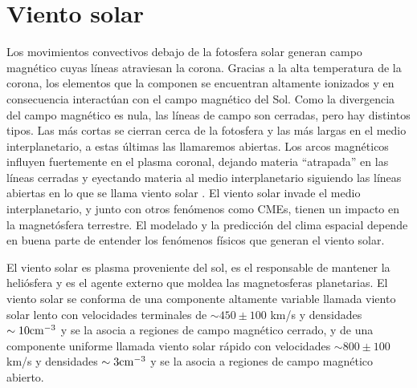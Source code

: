 \documentclass[a4paper,11pt]{report}
\begin{document}
\section{Viento solar}
Los movimientos convectivos debajo de la fotosfera solar generan campo magnético cuyas líneas atraviesan la corona. Gracias a la alta temperatura de la corona, los elementos que la componen se encuentran altamente ionizados y en consecuencia interactúan con el campo magnético del Sol. Como la divergencia del campo magnético es nula, las líneas de campo son cerradas, pero hay distintos tipos. Las más cortas se cierran cerca de la fotosfera y las más largas en el medio interplanetario, a estas últimas las llamaremos abiertas. Los arcos magnéticos influyen fuertemente en el plasma coronal, dejando materia ``atrapada'' en las líneas cerradas y eyectando materia al medio interplanetario siguiendo las líneas abiertas en lo que se llama {viento solar} . El viento solar invade el medio interplanetario, y junto con otros fenómenos como CMEs, tienen un impacto en la magnetósfera terrestre. El modelado y la predicción del clima espacial depende en buena parte de entender los fenómenos físicos que generan el viento solar.

El viento solar es plasma proveniente del sol, es el responsable de mantener la heliósfera y es el agente externo que moldea las magnetosferas planetarias. El viento solar se conforma de una componente altamente variable llamada viento solar lento con velocidades terminales de $\sim 450\pm 100$ km/s y densidades $\sim 10 \rm{ cm^{-3}}$ y se la asocia a regiones de campo magnético cerrado, y de una componente uniforme llamada viento solar rápido con velocidades $\sim 800\pm 100$ km/s y densidades $\sim 3 \rm{ cm^{-3}}$ y se la asocia a regiones de campo magnético abierto.
\end{document}
